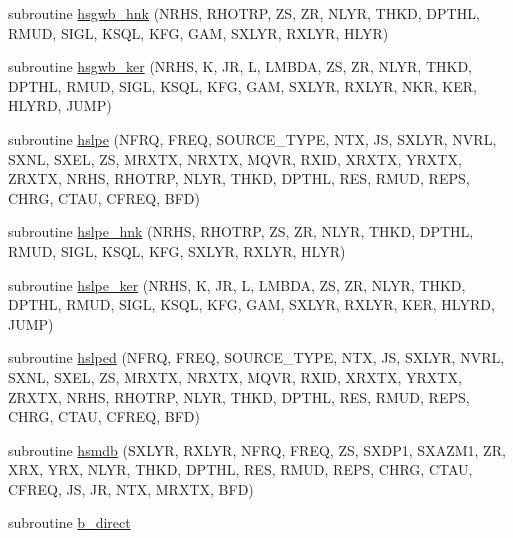 \begin{DoxyCompactItemize}
\item 
subroutine \hyperlink{Leroi__c_8f90_a8e78b7efe3dc41645eaf9123100f4fc1}{hsgwb\+\_\+hnk} (N\+R\+HS, R\+H\+O\+T\+RP, ZS, ZR, N\+L\+YR, T\+H\+KD, D\+P\+T\+HL, R\+M\+UD, S\+I\+GL, K\+S\+QL, K\+FG, G\+AM, S\+X\+L\+YR, R\+X\+L\+YR, H\+L\+YR)
\item 
subroutine \hyperlink{Leroi__c_8f90_ad4730d65d0e42fe38f0f174339af3c71}{hsgwb\+\_\+ker} (N\+R\+HS, K, JR, L, L\+M\+B\+DA, ZS, ZR, N\+L\+YR, T\+H\+KD, D\+P\+T\+HL, R\+M\+UD, S\+I\+GL, K\+S\+QL, K\+FG, G\+AM, S\+X\+L\+YR, R\+X\+L\+YR, N\+KR, K\+ER, H\+L\+Y\+RD, J\+U\+MP)
\item 
subroutine \hyperlink{Leroi__c_8f90_a918a25836d554d239ee900a00fbefbb6}{hslpe} (N\+F\+RQ, F\+R\+EQ, S\+O\+U\+R\+C\+E\+\_\+\+T\+Y\+PE, N\+TX, JS, S\+X\+L\+YR, N\+V\+RL, S\+X\+NL, S\+X\+EL, ZS, M\+R\+X\+TX, N\+R\+X\+TX, M\+Q\+VR, R\+X\+ID, X\+R\+X\+TX, Y\+R\+X\+TX, Z\+R\+X\+TX, N\+R\+HS, R\+H\+O\+T\+RP, N\+L\+YR, T\+H\+KD, D\+P\+T\+HL, R\+ES, R\+M\+UD, R\+E\+PS, C\+H\+RG, C\+T\+AU, C\+F\+R\+EQ, B\+FD)
\item 
subroutine \hyperlink{Leroi__c_8f90_adae61b12e3735bac162cd8f39a3607d3}{hslpe\+\_\+hnk} (N\+R\+HS, R\+H\+O\+T\+RP, ZS, ZR, N\+L\+YR, T\+H\+KD, D\+P\+T\+HL, R\+M\+UD, S\+I\+GL, K\+S\+QL, K\+FG, S\+X\+L\+YR, R\+X\+L\+YR, H\+L\+YR)
\item 
subroutine \hyperlink{Leroi__c_8f90_ae58b6750741316da9a6a86b44785fa58}{hslpe\+\_\+ker} (N\+R\+HS, K, JR, L, L\+M\+B\+DA, ZS, ZR, N\+L\+YR, T\+H\+KD, D\+P\+T\+HL, R\+M\+UD, S\+I\+GL, K\+S\+QL, K\+FG, G\+AM, S\+X\+L\+YR, R\+X\+L\+YR, K\+ER, H\+L\+Y\+RD, J\+U\+MP)
\item 
subroutine \hyperlink{Leroi__c_8f90_a1965f18ad74a78ddcda474fa4268445f}{hslped} (N\+F\+RQ, F\+R\+EQ, S\+O\+U\+R\+C\+E\+\_\+\+T\+Y\+PE, N\+TX, JS, S\+X\+L\+YR, N\+V\+RL, S\+X\+NL, S\+X\+EL, ZS, M\+R\+X\+TX, N\+R\+X\+TX, M\+Q\+VR, R\+X\+ID, X\+R\+X\+TX, Y\+R\+X\+TX, Z\+R\+X\+TX, N\+R\+HS, R\+H\+O\+T\+RP, N\+L\+YR, T\+H\+KD, D\+P\+T\+HL, R\+ES, R\+M\+UD, R\+E\+PS, C\+H\+RG, C\+T\+AU, C\+F\+R\+EQ, B\+FD)
\item 
subroutine \hyperlink{Leroi__c_8f90_a48d6fa7ecaca60caaf9ecba957eaa3b1}{hsmdb} (S\+X\+L\+YR, R\+X\+L\+YR, N\+F\+RQ, F\+R\+EQ, ZS, S\+X\+D\+P1, S\+X\+A\+Z\+M1, ZR, X\+RX, Y\+RX, N\+L\+YR, T\+H\+KD, D\+P\+T\+HL, R\+ES, R\+M\+UD, R\+E\+PS, C\+H\+RG, C\+T\+AU, C\+F\+R\+EQ, JS, JR, N\+TX, M\+R\+X\+TX, B\+FD)
\item 
subroutine \hyperlink{Leroi__c_8f90_a485defa6db785c79bb6a092cd797ca0e}{b\+\_\+direct}
\item 

\end{DoxyCompactItemize}
